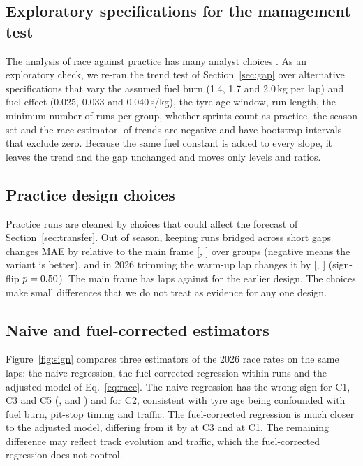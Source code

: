 \subsection{Exploratory specifications for the management test}

The analysis of race against practice has many analyst choices \citep{gelman2014crisis}.
As an exploratory check, we re-ran the trend test of Section~\ref{sec:gap} over \MultiverseSpecs{} alternative specifications that vary the assumed fuel burn (1.4, 1.7 and 2.0\,kg per lap) and fuel effect (0.025, 0.033 and 0.040\,s/kg), the tyre-age window, run length, the minimum number of runs per group, whether sprints count as practice, the season set and the race estimator.
\MultiverseNegative{} of \MultiverseSpecs{} trends are negative and \MultiverseExcludesZero{} have bootstrap intervals that exclude zero.
Because the same fuel constant is added to every slope, it leaves the trend and the gap unchanged and moves only levels and ratios.

\subsection{Practice design choices}

Practice runs are cleaned by choices that could affect the forecast of Section~\ref{sec:transfer}.
Out of season, keeping runs bridged across short gaps changes MAE by \KeepRunsDiff\spl{} relative to the main frame [\KeepRunsDiffLo, \KeepRunsDiffHi] over \KeepRunsCommonCells{} groups (negative means the variant is better), and in 2026 trimming the warm-up lap changes it by \WarmupDiff\spl{} [\WarmupDiffLo, \WarmupDiffHi] (sign-flip $p=0.50$).
The main frame has \PracticeLapsShipped{} laps against \PracticeLapsLegacy{} for the earlier design.
The choices make small differences that we do not treat as evidence for any one design.

\subsection{Naive and fuel-corrected estimators}\label{app:ablation}

Figure~\ref{fig:sign} compares three estimators of the 2026 race rates on the same laps: the naive regression, the fuel-corrected regression within runs and the adjusted model of Eq.~\eqref{eq:race}.
The naive regression has the wrong sign for C1, C3 and C5 (\NaiveCOne, \NaiveCThree{} and \NaiveCFive\spl) and \NaiveCTwo\spl{} for C2, consistent with tyre age being confounded with fuel burn, pit-stop timing and traffic.
The fuel-corrected regression is much closer to the adjusted model, differing from it by \AblGapCThree\spl{} at C3 and \AblGapCOne\spl{} at C1.
The remaining difference may reflect track evolution and traffic, which the fuel-corrected regression does not control.

